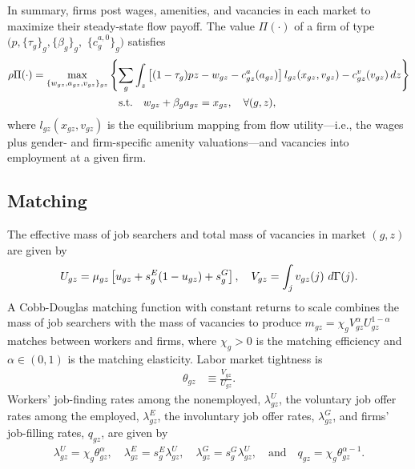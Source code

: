 In summary, firms post wages, amenities, and vacancies in each market to maximize their steady-state flow payoff. The value $\Pi(\cdot)$ of a firm of type $(p, \{\tau_{g}\}_{g}, \{\beta_{g}\}_{g},$ $\{c_{g}^{a,0}\}_{g})$ satisfies
% 
\begin{align}
    \rho \Pi (\cdot) = \max_{\{w_{gz}, a_{gz}, v_{gz}\}_{gz}} & \left\{ \sum_{g} \int_{z} \left[ (1 - \tau_{g}) p z - w_{gz} - c_{gz}^{a}(a_{gz}) \right] l_{gz}(x_{gz}, v_{gz}) - c_{gz}^{v}(v_{gz}) \mathop{}\!{d} z \right\} \notag \\
    & \quad \text{s.t.} \quad w_{gz} + \beta_{g} a_{gz} = x_{gz}, \quad \forall (g, z), \label{eq:firm_problem}
\end{align}
%
where $l_{gz}(x_{gz}, v_{gz})$ is the equilibrium mapping from flow utility---i.e., the wages plus gender- and firm-specific amenity valuations---and vacancies into employment at a given firm.


\subsection{Matching}

The effective mass of job searchers and total mass of vacancies in market $(g, z)$ are given by
%
\begin{align}
    U_{gz} = \mu_{gz} \left[ u_{gz} + s_{g}^{E} (1 - u_{gz}) + s_{g}^{G} \right], \quad V_{gz} = \int_{j} v_{gz}(j) \, \diff\Gamma(j). \label{eq:aggregate_vacancies} %
\end{align}
%
A Cobb-Douglas matching function with constant returns to scale combines the mass of job searchers with the mass of vacancies to produce $m_{gz} = \chi_{g} V_{gz}^{\alpha} U_{gz}^{1 - \alpha}$ matches between workers and firms, where $\chi_{g} > 0$ is the matching efficiency and $\alpha \in (0,1)$ is the matching elasticity. Labor market tightness is
%
\begin{align}
    \theta_{gz} &\equiv \frac{V_{gz}}{U_{gz}}. \label{eq:market_tightness}
\end{align}
%
Workers' job-finding rates among the nonemployed, $\lambda_{gz}^{U}$, the voluntary job offer rates among the employed, $\lambda_{gz}^{E}$, the involuntary job offer rates, $\lambda_{gz}^{G}$, and firms' job-filling rates, $q_{gz}$, are given by
%
\begin{align}
    \lambda_{gz}^{U} = \chi_{g} \theta_{gz}^{\alpha}, %
    \quad %
    \lambda_{gz}^{E} = s_{g}^{E} \lambda_{gz}^{U}, %
    \quad %
    \lambda_{gz}^{G} = s_{g}^{G} \lambda_{gz}^{U}, %
    \quad \text{and} %
    \quad%
    q_{gz} = \chi_{g} \theta_{gz}^{\alpha - 1}. \label{eq:offer_arrival_rates}
\end{align}



